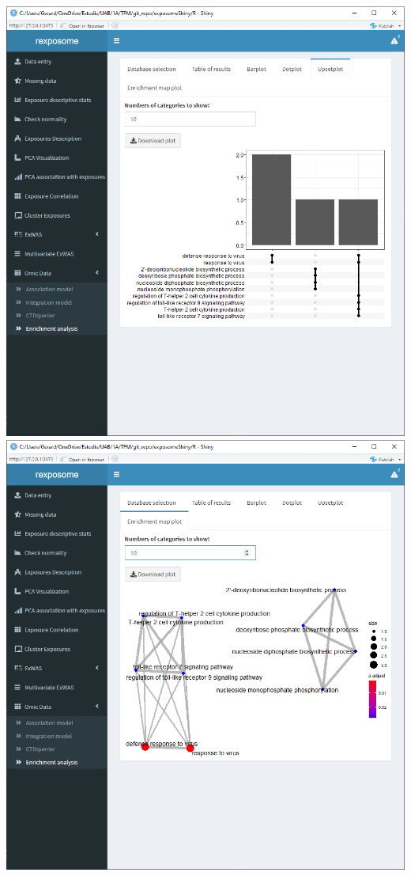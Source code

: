 \documentclass[
]{book}
\begin{document}
\includegraphics{images/analysis11_5.png}
\includegraphics{images/analysis11_6.png}
\end{document}
